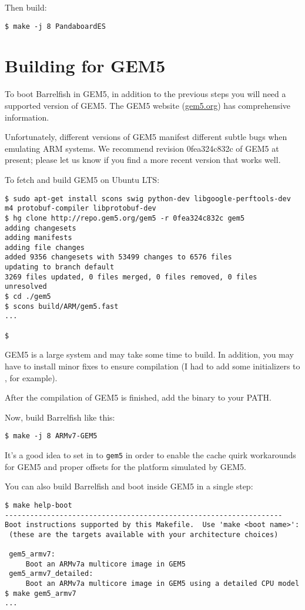 \documentclass[a4paper,twoside]{report} %
\begin{document}
Then build:

\begin{lstlisting}
$ make -j 8 PandaboardES
\end{lstlisting}

\section{Building for GEM5}

To boot Barrelfish in GEM5, in addition to the previous steps you
will need a supported version of GEM5.  The GEM5 website
(\url{gem5.org}) has comprehensive information. 

Unfortunately, different
versions of GEM5 manifest different subtle bugs when emulating ARM
systems.  We recommend revision 0fea324c832c of GEM5 at present;
please let us know if you find a more recent version that works well. 

To fetch and build GEM5 on Ubuntu LTS:

\begin{lstlisting}
$ sudo apt-get install scons swig python-dev libgoogle-perftools-dev m4 protobuf-compiler libprotobuf-dev
$ hg clone http://repo.gem5.org/gem5 -r 0fea324c832c gem5
adding changesets
adding manifests
adding file changes
added 9356 changesets with 53499 changes to 6576 files
updating to branch default
3269 files updated, 0 files merged, 0 files removed, 0 files unresolved
$ cd ./gem5 
$ scons build/ARM/gem5.fast
...

$
\end{lstlisting}

GEM5 is a large system and may take some time to build.  In addition,
you may have to install minor fixes to ensure compilation (I had to
add some initializers to , for
example). 

After the compilation of GEM5 is finished, add the binary to your PATH.

Now, build Barrelfish like this:
\begin{lstlisting}
$ make -j 8 ARMv7-GEM5
\end{lstlisting}

It's a good idea to set  in
 to \texttt{gem5} in order to enable
the cache quirk workarounds for GEM5 and proper offsets for the
platform simulated by GEM5.

You can also build Barrelfish and boot inside GEM5 in a single step:

\begin{lstlisting}
$ make help-boot
------------------------------------------------------------------
Boot instructions supported by this Makefile.  Use 'make <boot name>':
 (these are the targets available with your architecture choices)

 gem5_armv7:
	 Boot an ARMv7a multicore image in GEM5
 gem5_armv7_detailed:
	 Boot an ARMv7a multicore image in GEM5 using a detailed CPU model
$ make gem5_armv7
...
\end{lstlisting}
\end{document}
